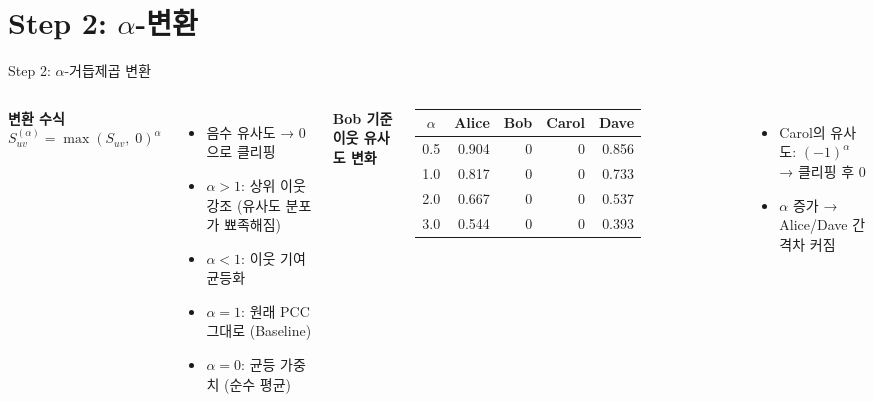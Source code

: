 \documentclass[aspectratio=169, 10pt]{beamer}
\begin{document}
\section{Step 2: \texorpdfstring{$\alpha$}{alpha}-변환}

\begin{frame}{Step 2: $\alpha$-거듭제곱 변환}

  \begin{columns}[T]
      \textbf{변환 수식}
      \[
        S_{uv}^{(\alpha)} = \max(S_{uv},\; 0)^{\alpha}
      \]
      \begin{itemize}
        \item 음수 유사도 → 0으로 클리핑
        \item $\alpha > 1$: 상위 이웃 강조 (유사도 분포가 뾰족해짐)
        \item $\alpha < 1$: 이웃 기여 균등화
        \item $\alpha = 1$: 원래 PCC 그대로 (Baseline)
        \item $\alpha = 0$: 균등 가중치 (순수 평균)
      \end{itemize}

      \textbf{Bob 기준 이웃 유사도 변화}
      \vspace{0.3em}

      \renewcommand{\arraystretch}{1.25}
      \begin{tabular}{c|rrrr}
        \toprule
        $\alpha$ & Alice & Bob & Carol & Dave \\
        \midrule
        0.5 & 0.904 & 0 & 0 & 0.856 \\
        \rowcolor{hilight}
        1.0 & 0.817 & 0 & 0 & 0.733 \\
        2.0 & 0.667 & 0 & 0 & 0.537 \\
        3.0 & 0.544 & 0 & 0 & 0.393 \\
        \bottomrule
      \end{tabular}
      \vspace{0.3em}
      \begin{itemize}
        \item Carol의 유사도: $(-1)^{\alpha}$ → 클리핑 후 0
        \item $\alpha$ 증가 → Alice/Dave 간 격차 커짐
      \end{itemize}
  \end{columns}
\end{frame}
\end{document}
